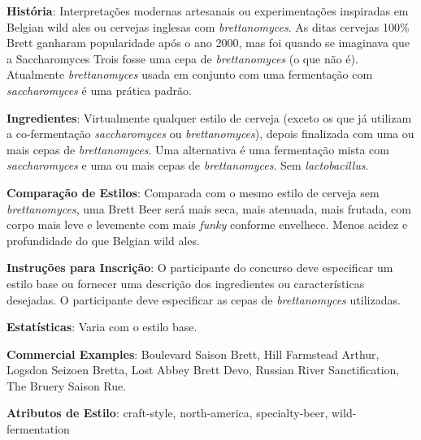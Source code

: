 \textbf{História}: Interpretações modernas artesanais ou experimentações inspiradas em Belgian wild ales ou cervejas inglesas com \textit{brettanomyces}. As ditas cervejas 100\% Brett ganharam popularidade após o ano 2000, mas foi quando se imaginava que a Saccharomyces Trois fosse uma cepa de \textit{brettanomyces} (o que não é). Atualmente \textit{brettanomyces} usada em conjunto com uma fermentação com \textit{saccharomyces} é uma prática padrão.

\textbf{Ingredientes}: Virtualmente qualquer estilo de cerveja (exceto os que já utilizam a co-fermentação \textit{saccharomyces} ou \textit{brettanomyces}), depois finalizada com uma ou mais cepas de \textit{brettanomyces}. Uma alternativa é uma fermentação mista com \textit{saccharomyces} e uma ou mais cepas de \textit{brettanomyces}. Sem \textit{lactobacillus}.

\textbf{Comparação de Estilos}: Comparada com o mesmo estilo de cerveja sem \textit{brettanomyces}, uma Brett Beer será mais seca, mais atenuada, mais frutada, com corpo mais leve e levemente com mais \textit{funky} conforme envelhece. Menos acidez e profundidade do que Belgian wild ales.

\textbf{Instruções para Inscrição}: O participante do concurso deve especificar um estilo base ou fornecer uma descrição dos ingredientes ou características desejadas. O participante deve especificar as cepas de \textit{brettanomyces} utilizadas.

\textbf{Estatísticas}: Varia com o estilo base.

\textbf{Commercial Examples}: Boulevard Saison Brett, Hill Farmstead Arthur, Logsdon Seizoen Bretta, Lost Abbey Brett Devo, Russian River Sanctification, The Bruery Saison Rue.

\textbf{Atributos de Estilo}: craft-style, north-america, specialty-beer, wild-fermentation
